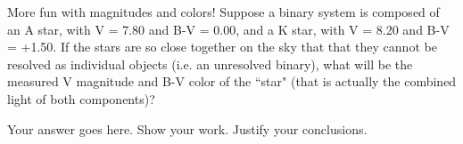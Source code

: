 \documentclass[12pt]{article}
\newenvironment{problem}[2][Problem]{\begin{trivlist}
\item[\hskip \labelsep {\bfseries #1}\hskip \labelsep {\bfseries #2.}]}{\end{trivlist}}
\newenvironment{answer}[2][Answer]{\begin{trivlist}
\item[\hskip \labelsep {\bfseries #1}\hskip \labelsep {\bfseries #2.}]}{\end{trivlist}}
\begin{document}
\begin{problem}{5} More fun with magnitudes and colors! Suppose a binary system is composed of an A star, with V = 7.80 and B-V = 0.00, and a K star, with V = 8.20 and B-V = +1.50. If the stars are so close together on the sky that that they cannot be resolved as individual objects (i.e. an unresolved binary), what will be the measured V magnitude and B-V color of the ``star" (that is actually the combined light of both components)? 

\end{problem}

\begin{answer}{5}
Your answer goes here. Show your work. Justify your conclusions.
\end{answer}
 
\end{document}
